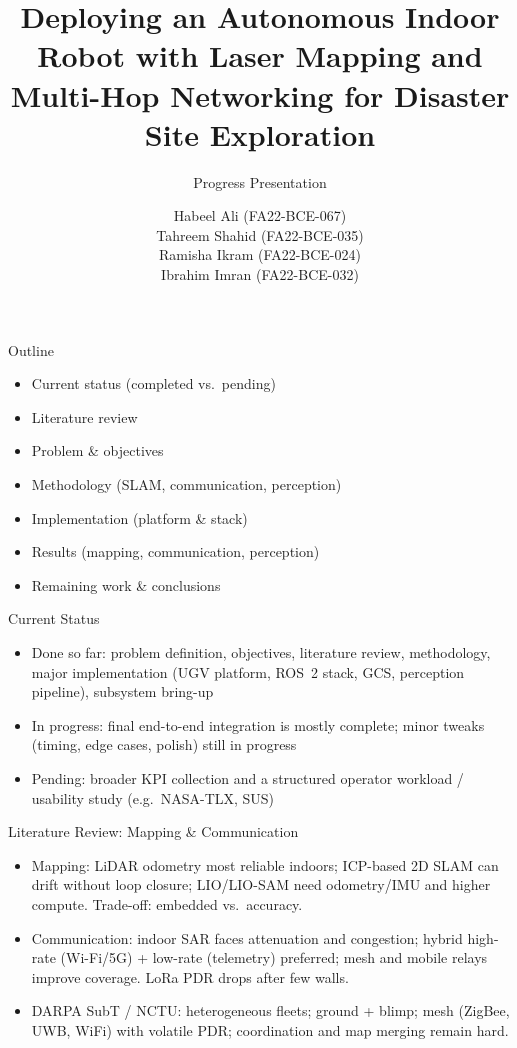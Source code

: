 \documentclass[aspectratio=169]{beamer}
\title{Deploying an Autonomous Indoor Robot with Laser Mapping and Multi-Hop Networking for Disaster Site Exploration}
\subtitle{Progress Presentation}
\author{
  Habeel Ali (FA22-BCE-067) \\
  Tahreem Shahid (FA22-BCE-035) \\
  Ramisha Ikram (FA22-BCE-024) \\
  Ibrahim Imran (FA22-BCE-032)
}
\date{}
\institute{FYP Progress}
\begin{document}
\begin{frame}
\titlepage
\end{frame}

\begin{frame}{Outline}
\begin{itemize}
\item Current status (completed vs.\ pending)
\item Literature review
\item Problem \& objectives
\item Methodology (SLAM, communication, perception)
\item Implementation (platform \& stack)
\item Results (mapping, communication, perception)
\item Remaining work \& conclusions
\end{itemize}
\end{frame}

\begin{frame}{Current Status}
\begin{itemize}
\item Done so far: problem definition, objectives, literature review, methodology, major implementation (UGV platform, ROS~2 stack, GCS, perception pipeline), subsystem bring-up
\item In progress: final end-to-end integration is mostly complete; minor tweaks (timing, edge cases, polish) still in progress
\item Pending: broader KPI collection and a structured operator workload / usability study (e.g.\ NASA-TLX, SUS)
\end{itemize}
\end{frame}

\begin{frame}{Literature Review: Mapping \& Communication}
\begin{itemize}
\item Mapping: LiDAR odometry most reliable indoors; ICP-based 2D SLAM can drift without loop closure; LIO/LIO-SAM need odometry/IMU and higher compute. Trade-off: embedded vs.\ accuracy.
\item Communication: indoor SAR faces attenuation and congestion; hybrid high-rate (Wi-Fi/5G) + low-rate (telemetry) preferred; mesh and mobile relays improve coverage. LoRa PDR drops after few walls.
\item DARPA SubT / NCTU: heterogeneous fleets; ground + blimp; mesh (ZigBee, UWB, WiFi) with volatile PDR; coordination and map merging remain hard.
\end{itemize}
\end{frame}
\end{document}
